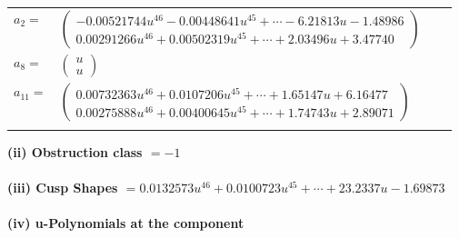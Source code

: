 \documentclass[1p]{elsarticle_modified}
\theoremstyle{definition}
\begin{document}
\begin{tabular}{m{7pt} m{180pt} m{7pt} m{180pt} }
\flushright $a_{2}=$&$\begin{pmatrix}-0.00521744 u^{46}-0.00448641 u^{45}+\cdots-6.21813 u-1.48986\\0.00291266 u^{46}+0.00502319 u^{45}+\cdots+2.03496 u+3.47740\end{pmatrix}$ \\
\flushright $a_{8}=$&$\begin{pmatrix}u\\u\end{pmatrix}$ \\
\flushright $a_{11}=$&$\begin{pmatrix}0.00732363 u^{46}+0.0107206 u^{45}+\cdots+1.65147 u+6.16477\\0.00275888 u^{46}+0.00400645 u^{45}+\cdots+1.74743 u+2.89071\end{pmatrix}$\\&\end{tabular}
\flushleft \textbf{(ii) Obstruction class $= -1$}\\~\\
\flushleft \textbf{(iii) Cusp Shapes $= 0.0132573 u^{46}+0.0100723 u^{45}+\cdots+23.2337 u-1.69873$}\\~\\
\newpage\renewcommand{\arraystretch}{1}
\flushleft \textbf{(iv) u-Polynomials at the component}\newline \\
\end{document}
